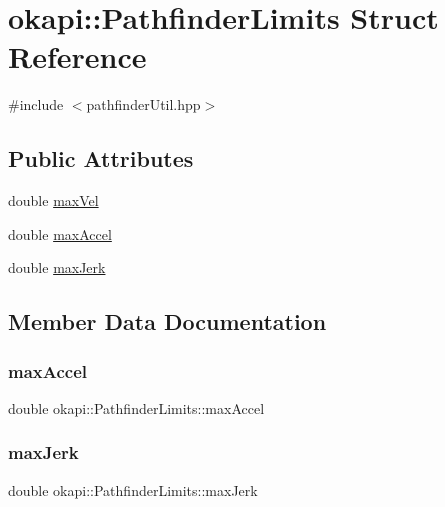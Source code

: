 \hypertarget{structokapi_1_1PathfinderLimits}{}\section{okapi\+::Pathfinder\+Limits Struct Reference}
\label{structokapi_1_1PathfinderLimits}


{\ttfamily \#include $<$pathfinder\+Util.\+hpp$>$}

\subsection*{Public Attributes}
\begin{DoxyCompactItemize}
\item 
double \mbox{\hyperlink{structokapi_1_1PathfinderLimits_a13aebfb7583a59b581e19eb51fa612b1}{max\+Vel}}
\item 
double \mbox{\hyperlink{structokapi_1_1PathfinderLimits_ae8d48e9e81e8ef6a5662d1bfb2bb242c}{max\+Accel}}
\item 
double \mbox{\hyperlink{structokapi_1_1PathfinderLimits_a8602f4203b183f242c94c83031847938}{max\+Jerk}}
\end{DoxyCompactItemize}


\subsection{Member Data Documentation}
\mbox{\label{structokapi_1_1PathfinderLimits_ae8d48e9e81e8ef6a5662d1bfb2bb242c}} 
\subsubsection{\texorpdfstring{maxAccel}{maxAccel}}
{\footnotesize\ttfamily double okapi\+::\+Pathfinder\+Limits\+::max\+Accel}

\mbox{\label{structokapi_1_1PathfinderLimits_a8602f4203b183f242c94c83031847938}} 
\subsubsection{\texorpdfstring{maxJerk}{maxJerk}}
{\footnotesize\ttfamily double okapi\+::\+Pathfinder\+Limits\+::max\+Jerk}


